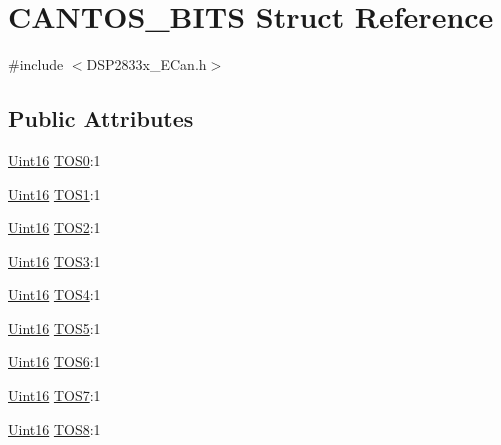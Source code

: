 \hypertarget{struct_c_a_n_t_o_s___b_i_t_s}{}\section{C\+A\+N\+T\+O\+S\+\_\+\+B\+I\+T\+S Struct Reference}
\label{struct_c_a_n_t_o_s___b_i_t_s}


{\ttfamily \#include $<$D\+S\+P2833x\+\_\+\+E\+Can.\+h$>$}

\subsection*{Public Attributes}
\begin{DoxyCompactItemize}
\item 
\hyperlink{_d_s_p2833x___device_8h_a59a9f6be4562c327cbfb4f7e8e18f08b}{Uint16} \hyperlink{struct_c_a_n_t_o_s___b_i_t_s_a685ddeccbeb527bd93b8fa506ad3eaec}{T\+O\+S0}\+:1
\item 
\hyperlink{_d_s_p2833x___device_8h_a59a9f6be4562c327cbfb4f7e8e18f08b}{Uint16} \hyperlink{struct_c_a_n_t_o_s___b_i_t_s_a01985e628f9f02ecdc1269db19523091}{T\+O\+S1}\+:1
\item 
\hyperlink{_d_s_p2833x___device_8h_a59a9f6be4562c327cbfb4f7e8e18f08b}{Uint16} \hyperlink{struct_c_a_n_t_o_s___b_i_t_s_a85632b14422ee138821e758885251097}{T\+O\+S2}\+:1
\item 
\hyperlink{_d_s_p2833x___device_8h_a59a9f6be4562c327cbfb4f7e8e18f08b}{Uint16} \hyperlink{struct_c_a_n_t_o_s___b_i_t_s_ae91fb48af0b4e2f2e91ab277a7a74978}{T\+O\+S3}\+:1
\item 
\hyperlink{_d_s_p2833x___device_8h_a59a9f6be4562c327cbfb4f7e8e18f08b}{Uint16} \hyperlink{struct_c_a_n_t_o_s___b_i_t_s_a277abdcd49f45cf5c353f72f280069e0}{T\+O\+S4}\+:1
\item 
\hyperlink{_d_s_p2833x___device_8h_a59a9f6be4562c327cbfb4f7e8e18f08b}{Uint16} \hyperlink{struct_c_a_n_t_o_s___b_i_t_s_a78105a2b4f3c58bb8ef1bd4cecaa4ab9}{T\+O\+S5}\+:1
\item 
\hyperlink{_d_s_p2833x___device_8h_a59a9f6be4562c327cbfb4f7e8e18f08b}{Uint16} \hyperlink{struct_c_a_n_t_o_s___b_i_t_s_a3dfedeab24a00bcfde5258f98d856fec}{T\+O\+S6}\+:1
\item 
\hyperlink{_d_s_p2833x___device_8h_a59a9f6be4562c327cbfb4f7e8e18f08b}{Uint16} \hyperlink{struct_c_a_n_t_o_s___b_i_t_s_a2cc5be16b9e269a85708a45b4934d3b0}{T\+O\+S7}\+:1
\item 
\hyperlink{_d_s_p2833x___device_8h_a59a9f6be4562c327cbfb4f7e8e18f08b}{Uint16} \hyperlink{struct_c_a_n_t_o_s___b_i_t_s_a94d659637ec1010ca7ee15e5901c6772}{T\+O\+S8}\+:1

\end{DoxyCompactItemize}
